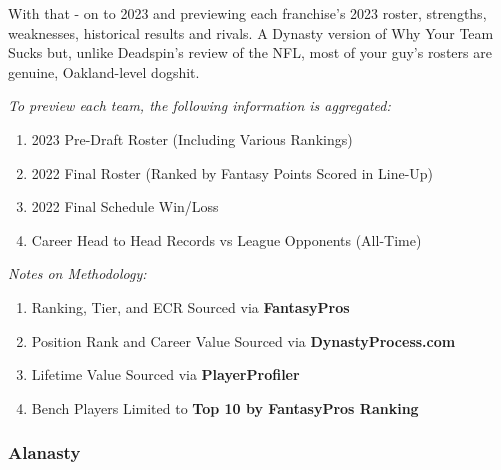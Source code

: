\documentclass[
]{article}
\begin{document}
With that - on to 2023 and previewing each franchise's 2023 roster,
strengths, weaknesses, historical results and rivals. A Dynasty version
of Why Your Team Sucks but, unlike Deadspin's review of the NFL, most of
your guy's rosters are genuine, Oakland-level dogshit.

\emph{To preview each team, the following information is aggregated:}

\begin{enumerate}
\def\labelenumi{\arabic{enumi}.}
\item
  2023 Pre-Draft Roster (Including Various Rankings)
\item
  2022 Final Roster (Ranked by Fantasy Points Scored in Line-Up)
\item
  2022 Final Schedule Win/Loss
\item
  Career Head to Head Records vs League Opponents (All-Time)
\end{enumerate}

\emph{Notes on Methodology:}

\begin{enumerate}
\def\labelenumi{\arabic{enumi}.}
\item
  Ranking, Tier, and ECR Sourced via \textbf{FantasyPros}
\item
  Position Rank and Career Value Sourced via \textbf{DynastyProcess.com}
\item
  Lifetime Value Sourced via \textbf{PlayerProfiler}
\item
  Bench Players Limited to \textbf{Top 10 by FantasyPros Ranking}
\end{enumerate}

\hypertarget{alanasty}{%
\subsubsection{Alanasty}\label{alanasty}}
\end{document}
